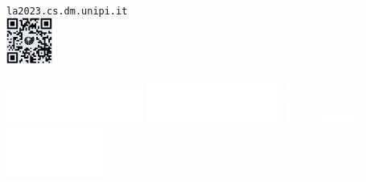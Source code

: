 \documentclass[a4paper]{article}
\begin{document}
\\
    \mbox{}\hspace{1cm}
    \begin{minipage}{2cm}
    {\mbox{\hspace{-0.2cm}}\tiny\texttt{la2023.cs.dm.unipi.it}}\\
    \includegraphics*[height=1.5cm]{qr-bw.png}\mbox{}
    \vspace{1.2cm}\mbox{}
    \end{minipage}
    \noindent
    \hspace{0.5cm}
    \includegraphics*[height=1.3cm]{matematica_dx_bianco.pdf}
    \hspace{0.1cm}
    \includegraphics*[height=1.5cm]{marchio_unipi_orizz_white.png}
    \mbox{}\hspace{0.5cm}
    \includegraphics*[height=1.5cm]{Sns-Scuola-Normale-Superiore-Pisa.png}
    \hspace{0.5cm}
    \includegraphics*[height=1.6cm]{logo_DIMAI_positivo-1-768x384.png}
    \mbox{}
\end{document}
